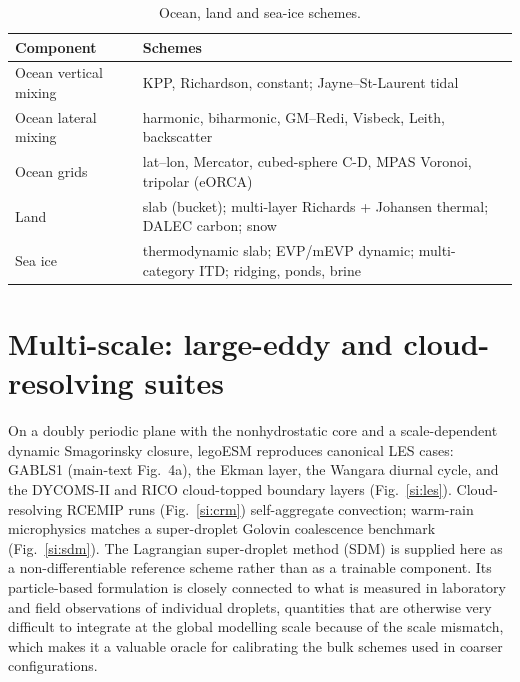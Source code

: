 \documentclass[11pt]{article}
\begin{document}
\begin{table}[h]\centering\footnotesize
\caption{Ocean, land and sea-ice schemes.}\label{tab:oli}
\begin{tabular}{@{}lp{10.5cm}@{}}
\toprule
Component & Schemes \\
\midrule
Ocean vertical mixing & KPP, Richardson, constant; Jayne--St-Laurent tidal \\
Ocean lateral mixing  & harmonic, biharmonic, GM--Redi, Visbeck, Leith, backscatter \\
Ocean grids           & lat--lon, Mercator, cubed-sphere C-D, MPAS Voronoi, tripolar (eORCA) \\
Land                  & slab (bucket); multi-layer Richards + Johansen thermal; DALEC carbon; snow \\
Sea ice               & thermodynamic slab; EVP/mEVP dynamic; multi-category ITD; ridging, ponds, brine \\
\bottomrule
\end{tabular}
\end{table}

\section{Multi-scale: large-eddy and cloud-resolving suites}
On a doubly periodic plane with the nonhydrostatic core and a scale-dependent dynamic
Smagorinsky closure, legoESM reproduces canonical LES cases: GABLS1\cite{Beare2006} (main-text
Fig.~4a), the Ekman layer, the Wangara diurnal cycle, and the DYCOMS-II\cite{Stevens2005} and
RICO\cite{vanZanten2011} cloud-topped boundary layers (Fig.~\ref{si:les}). Cloud-resolving
RCEMIP\cite{Wing2018} runs (Fig.~\ref{si:crm}) self-aggregate convection; warm-rain
microphysics matches a super-droplet Golovin coalescence benchmark\cite{Shima2009,Bartman2022}
(Fig.~\ref{si:sdm}). The Lagrangian super-droplet method (SDM) is supplied here as a
non-differentiable reference scheme rather than as a trainable component. Its particle-based
formulation is closely connected to what is measured in laboratory and field observations of
individual droplets, quantities that are otherwise very difficult to integrate at the global
modelling scale because of the scale mismatch, which makes it a valuable oracle for calibrating
the bulk schemes used in coarser configurations.
\end{document}
